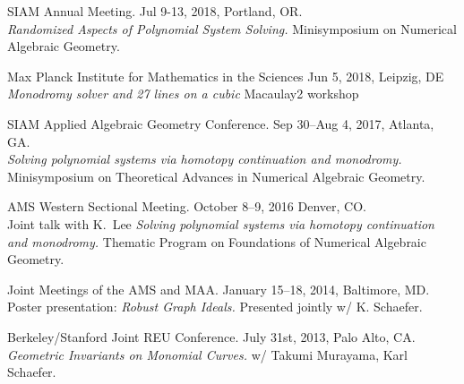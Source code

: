 \documentclass[margin,line,pifont,palatino,courier]{res}
\begin{document}
\begin{resume}
\par SIAM Annual Meeting. \hfill Jul 9-13, 2018, Portland, OR. \\
\textit{Randomized Aspects of Polynomial System Solving.} Minisymposium on Numerical Algebraic Geometry.

\par Max Planck Institute for Mathematics in the Sciences \hfill Jun 5, 2018, Leipzig, DE\\
\textit{Monodromy solver and 27 lines on a cubic} Macaulay2 workshop

\par SIAM Applied Algebraic Geometry Conference. \hfill Sep 30--Aug 4, 2017, Atlanta, GA. \\
\textit{Solving polynomial systems via homotopy continuation and monodromy.} Minisymposium on Theoretical Advances in Numerical Algebraic Geometry.

\par AMS Western Sectional Meeting. \hfill October 8--9, 2016 Denver, CO.\\
Joint talk with K.~Lee \textit{Solving polynomial systems via homotopy continuation and monodromy.} Thematic Program on Foundations of Numerical Algebraic Geometry.

\par Joint Meetings of the AMS and MAA. \hfill January 15--18, 2014, Baltimore, MD.\\
Poster presentation: \textit{Robust Graph Ideals.} Presented jointly w/ K. Schaefer.

\par Berkeley/Stanford Joint REU Conference. \hfill July 31st, 2013, Palo Alto, CA.\\
\textit{Geometric Invariants on Monomial Curves.} w/ Takumi Murayama, Karl Schaefer. 

\end{resume}
\end{document}
